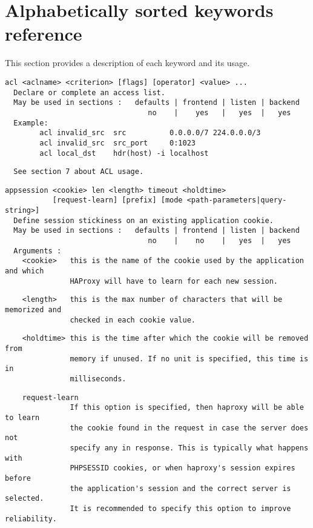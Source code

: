 
\section{Alphabetically sorted keywords reference}

This section provides a description of each keyword and its usage.

\begin{verbatim}
acl <aclname> <criterion> [flags] [operator] <value> ...
  Declare or complete an access list.
  May be used in sections :   defaults | frontend | listen | backend
                                 no    |    yes   |   yes  |   yes
  Example:
        acl invalid_src  src          0.0.0.0/7 224.0.0.0/3
        acl invalid_src  src_port     0:1023
        acl local_dst    hdr(host) -i localhost
\end{verbatim}

\begin{verbatim}
  See section 7 about ACL usage.
\end{verbatim}

\begin{verbatim}
appsession <cookie> len <length> timeout <holdtime>
           [request-learn] [prefix] [mode <path-parameters|query-string>]
  Define session stickiness on an existing application cookie.
  May be used in sections :   defaults | frontend | listen | backend
                                 no    |    no    |   yes  |   yes
  Arguments :
    <cookie>   this is the name of the cookie used by the application and which
               HAProxy will have to learn for each new session.
\end{verbatim}

\begin{verbatim}
    <length>   this is the max number of characters that will be memorized and
               checked in each cookie value.
\end{verbatim}

\begin{verbatim}
    <holdtime> this is the time after which the cookie will be removed from
               memory if unused. If no unit is specified, this time is in
               milliseconds.
\end{verbatim}

\begin{verbatim}
    request-learn
               If this option is specified, then haproxy will be able to learn
               the cookie found in the request in case the server does not
               specify any in response. This is typically what happens with
               PHPSESSID cookies, or when haproxy's session expires before
               the application's session and the correct server is selected.
               It is recommended to specify this option to improve reliability.
\end{verbatim}


